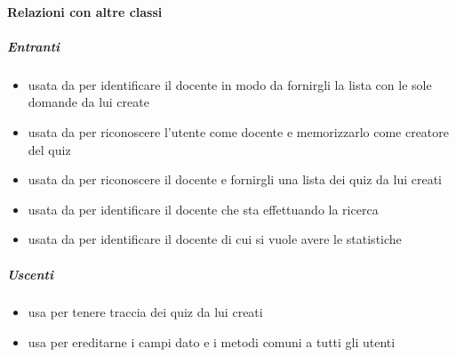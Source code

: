 \paragraph{Relazioni con altre classi}
\subparagraph{Entranti}
\begin{itemize}
\item usata da  per identificare il docente in modo da fornirgli la lista con le sole domande da lui create
\item usata da  per riconoscere l'utente come docente e memorizzarlo come creatore del quiz
\item usata da  per riconoscere il docente e fornirgli una lista dei quiz da lui creati
\item usata da  per identificare il docente che sta effettuando la ricerca
\item usata da  per identificare il docente di cui si vuole avere le statistiche
\end{itemize}
\subparagraph{Uscenti}
\begin{itemize}
\item usa  per tenere traccia dei quiz da lui creati
\item usa  per ereditarne i campi dato e i metodi comuni a tutti gli utenti
\end{itemize}
